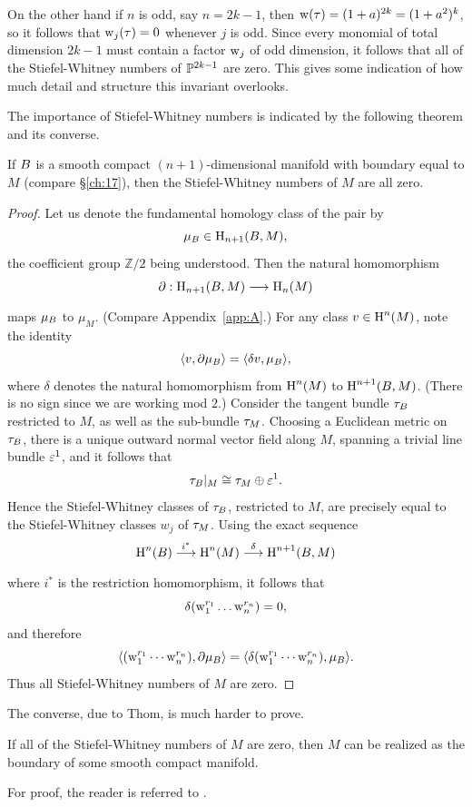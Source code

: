 \documentclass[../main]{subfiles}
\begin{document}
On the other hand if $n$ is odd, say $n=2k-1$, then $\operatorname{w}(\tau)=(1+a)^{2k}=(1+a^{2})^{k}$, so it follows that $\operatorname{w}_{j}(\tau)=0$ whenever $j$ is odd. Since every monomial of total dimension $2k-1$ must contain a factor $\operatorname{w}_{j}$ of odd dimension, it follows that all of the Stiefel-Whitney numbers of $\mathbb{P}^{2k-1}$ are zero. This gives some indication of how much detail and structure this invariant overlooks.

The importance of Stiefel-Whitney numbers is indicated by the following theorem and its converse.
\begin{theorem}[Pontrjagin]
\label{thm:04.09}
If $B$ is a smooth compact $(n+1)$-dimensional manifold with boundary equal to $M$ (compare \S\ref{ch:17}), then the Stiefel-Whitney numbers of $M$ are all zero.
\end{theorem}

\begin{proof}
Let us denote the fundamental homology class of the pair by
\[
\mu_{B}\in\operatorname{H}_{n+1}(B,M),
\]
the coefficient group $\mathbb{Z}/2$ being understood. Then the natural homomorphism
\[
 \partial:\homology_{n+1}(\B, M)\varrightarrow{} {\homology_{n}(M)}
\]
maps $\mu_{B}$ to $ \mu_M $. (Compare Appendix~\ref{app:A}.) For any class $v\in \operatorname{H}^{n}(M)$, note the identity
\[
\langle v,\partial\mu_{B} \rangle=\langle\delta v,\mu_{B}\rangle,
\]
where $\delta$ denotes the natural homomorphism from $\operatorname{H}^{n}(M)$ to $\operatorname{H}^{n+1}(B ,M)$. (There is no sign since we are working mod $2$.) Consider the tangent	bundle $\tau_{B}$ restricted to $M$, as well as the sub-bundle $\tau_{M}$. Choosing a	Euclidean metric on $\tau_{B}$, there is a unique outward normal vector field along $M$, spanning a trivial line bundle $\varepsilon^1$, and it follows that
\[
\tau_{B} |_M\cong\tau_{M}\oplus\varepsilon^1.
\]
Hence the Stiefel-Whitney classes of $\tau_{B} $, restricted to $M$, are precisely equal to the Stiefel-Whitney classes $w_j$ of $\tau_{M}$. Using the exact sequence
\[
\homology^n(\B )\varrightarrow{i^\ast}\homology^n(M)\varrightarrow{\delta} \homology^{n+1}(\B,M)
\]
where $i^\ast $ is the restriction homomorphism, it follows that
\[
\delta({\operatorname{w}}_{1}^{r_{1}} \dots \operatorname{w}_{n}^{r_n})=0,
\]
and therefore
\[
\langle({\operatorname{w}}_{1}^{r_{1}} \cdots \operatorname{w}_{n}^{r_n}),\partial\mu_{B} \rangle=\langle\delta({\operatorname{w}}_{1}^{r_{1}} \cdots \operatorname{w}_{n}^{r_n}),\mu_{B} \rangle.
\]
Thus all Stiefel-Whitney numbers of $M$ are zero.
\end{proof}
The converse, due to Thom, is much harder to prove. 
\begin{theorem}[Thom]
\label{thm:04.10}
If all of the Stiefel-Whitney numbers
of $M$ are zero, then $M$ can be realized as the boundary of some smooth compact manifold.
\end{theorem}
For proof, the reader is referred to \cite{stongcobordism1968}.
\end{document}
